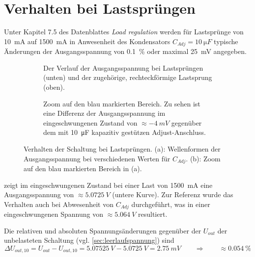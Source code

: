 	\section{Verhalten bei Lastsprüngen}
		Unter Kapitel 7.5 des Datenblattes \textit{Load regulation} werden für Lastsprünge von \SI{10}{mA} auf \SI{1500}{mA} in Anwesenheit des Kondensators \(C_{Adj} = \SI{10}{\micro F}\)
		typische Änderungen der Ausgangsspannung von \SI{0,1}{\percent} oder maximal \SI{25}{mV} angegeben.\par
		\begin{figure}[h]
			\centering
			\begin{subfigure}[]{.8\textwidth}
				\centering
				
				\caption[]{Der Verlauf der Ausgangsspannung bei Lastsprüngen (unten) und der zugehörige, rechteckförmige Lastsprung (oben).}
				\label{subfig:load transient response}
			\end{subfigure}
			\vspace{3mm}
			\begin{subfigure}[]{.8\textwidth}
				
				\caption[]{Zoom auf den blau markierten Bereich. Zu sehen ist eine Differenz der Ausgangsspannung im eingeschwungenen Zustand von \(\approx \SI{-4}{mV}\) gegenüber dem
				mit \SI{10}{\micro F} kapazitiv gestützen Adjust-Anschluss.}
				\label{subfig:load transient response deltaU}
			\end{subfigure}
			\caption[Verhalten der Schaltung bei Lastsprüngen]{Verhalten der Schaltung bei Lastsprüngen. (a): Wellenformen der Ausgangsspannung bei verschiedenen Werten für \(C_{Adj}\).
			(b): Zoom auf den blau markierten Bereich in (a).}
		\end{figure}
		 zeigt im eingeschwungenen Zustand bei einer Last von \SI{1500}{mA} eine
		Ausgangsspannung von \(\approx \SI{5,0725}{V}\) (untere Kurve). Zur Referenz wurde das Verhalten auch bei Abwesenheit von \(C_{Adj}\) durchgeführt, was
		in einer eingeschwungenen Spannung von \(\approx \SI{5,064}{V}\) resultiert.\par
		Die relativen und absoluten Spannungsänderungen gegenüber der \(U_{out}\) der unbelasteten Schaltung (vgl. \cref{sec:leerlaufspannung}) sind
		\begin{equation}
			\Delta U_{out,10} = U_{out} - U_{out,10} = \SI{5,07525}{V} - \SI{5,0725}{V} = \SI{2,75}{mV} \qquad \Rightarrow \qquad \approx \SI{0,054}{\percent}
		\end{equation}

